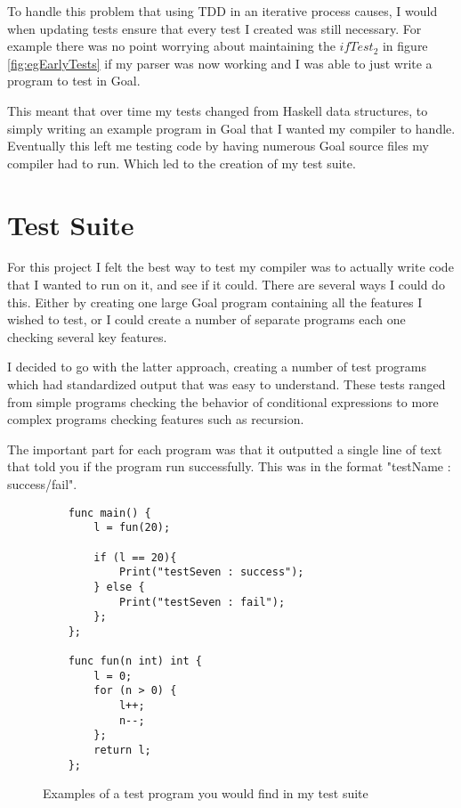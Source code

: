 To handle this problem that using TDD in an iterative process causes, I would when updating tests ensure that every test I created was still necessary. For example there was no point worrying about maintaining the $ifTest_2$ in figure \ref{fig:egEarlyTests} if my parser was now working and I was able to just write a program to test in Goal. 

This meant that over time my tests changed from Haskell data structures, to simply writing an example program in Goal that I wanted my compiler to handle. Eventually this left me testing code by having numerous Goal source files my compiler had to run. Which led to the creation of my test suite.   

\section{Test Suite}

For this project I felt the best way to test my compiler was to actually write code that I wanted to run on it, and see if it could. There are several ways I could do this. Either by creating one large Goal program containing all the features I wished to test, or I could create a number of separate programs each one checking several key features.

I decided to go with the latter approach, creating a number of test programs which had standardized output that was easy to understand. These tests ranged from simple programs checking the behavior of conditional expressions to more complex programs checking features such as recursion.

The important part for each program was that it outputted a single line of text that told you if the program run successfully. This was in the format "testName : success/fail".   

\begin{figure}[h]
\centering
\begin{lstlisting}
	func main() {
	    l = fun(20);
	    
	    if (l == 20){
	        Print("testSeven : success");
	    } else {
	        Print("testSeven : fail");
	    };
	};
	
	func fun(n int) int {
	    l = 0; 
	    for (n > 0) {
	        l++;
	        n--;
	    };
	    return l;
	};
\end{lstlisting}	
\caption{Examples of a test program you would find in my test suite}
\label{fig:egTestProg} 
\end{figure}   

